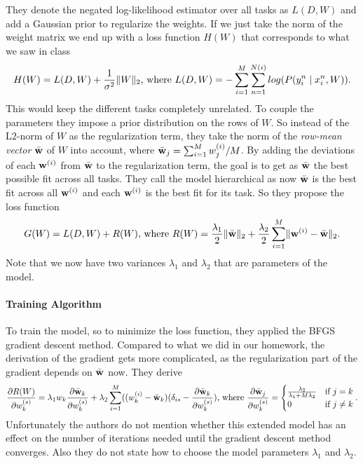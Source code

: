 They denote the negated log-likelihood estimator over all tasks as $L(D,W)$ and add a Gaussian prior to regularize the weights. If we just take the norm of the weight matrix we end up with a loss function $H(W)$ that corresponds to what we saw in class
\begin{align*}
H(W) = L(D,W) + \frac{1}{\sigma^2} \lVert W\rVert_2 \text{, where } L(D,W) = -\sum_{i=1}^{M} \sum_{n=1}^{N(i)} log(P(y_i^n \mid x_i^n, W)).
\end{align*}
This would keep the different tasks completely unrelated. To couple the parameters they impose a prior distribution on the rows of $W$. So instead of the L2-norm of $W$ as the regularization term, they take the norm of the \emph{row-mean vector} $\bar{\textbf{w}}$ of $W$ into account, where $\bar{\textbf{w}}_j = \sum_{i=1}^M w_{j}^{(i)}/M$.
By adding the deviations of each $\textbf{w}^{(i)}$ from $\bar{\textbf{w}}$ to the regularization term, the goal is to get as $\bar{\textbf{w}}$ the best possible fit across all tasks. They call the model hierarchical as now $\bar{\textbf{w}}$ is the best fit across all $\textbf{w}^{(i)}$ and each $\textbf{w}^{(i)}$ is the best fit for its task. So they propose the loss function
\begin{align*}
G(W) = L(D,W) + R(W) \text{, where } R(W) = \frac{\lambda_1}{2} \lVert\bar{\textbf{w}}\rVert_2 + \frac{\lambda_2}{2} \sum_{i=1}^M \lVert\textbf{w}^{(i)} - \bar{\textbf{w}}\rVert_2.
\end{align*}
Note that we now have two variances $\lambda_1$ and $\lambda_2$ that are parameters of the model.

\paragraph{Training Algorithm}
To train the model, so to minimize the loss function, they applied the BFGS gradient descent method. Compared to what we did in our homework, the derivation of the gradient gets more complicated, as the regularization part of the gradient depends on $\bar{\textbf{w}}$ now. They derive
\begin{align*}
\frac{\partial R(W)}{\partial w_k^{(s)}} = \lambda_1 w_k\frac{\partial \bar{\textbf{w}}_k}{\partial w_k^{(s)}} + \lambda_2 \sum_{i=1}^{M}((w_k^{(i)} - \bar{\textbf{w}}_k)(\delta_{is} - \frac{\partial\bar{\textbf{w}}_k}{\partial w_k^{(s)}}) \text{, where } \frac{\partial \bar{\textbf{w}}_j}{\partial w_k^{(s)}} = \begin{cases} \frac{\lambda_2}{\lambda_1 + M\lambda_2} & \text{if } j=k\\
0 & \text{if } j\neq k
\end{cases}.
\end{align*}
Unfortunately the authors do not mention whether this extended model has an effect on the number of iterations needed until the gradient descent method converges. Also they do not state how to choose the model parameters $\lambda_1$ and $\lambda_2$.
